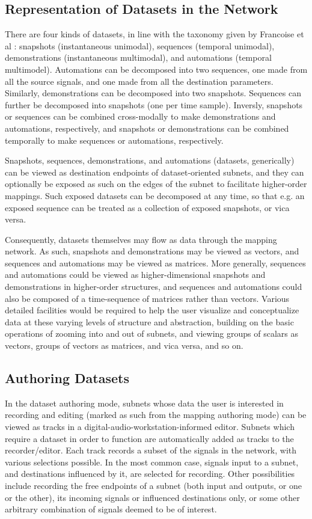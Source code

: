 \documentclass[main.tex]{subfiles}
\begin{document}
\subsection{Representation of Datasets in the Network}

There are four kinds of datasets, in line with the taxonomy given by Francoise 
et al \cite{francoise2014nime_xmm}: snapshots (instantaneous unimodal), 
sequences (temporal unimodal), demonstrations (instantaneous multimodal), and 
automations (temporal multimodel). Automations can be decomposed into two 
sequences, one made from all the source signals, and one made from all the 
destination parameters. Similarly, demonstrations can be decomposed into two 
snapshots. Sequences can further be decomposed into snapshots (one per time 
sample). Inversly, snapshots or sequences can be combined cross-modally to make 
demonstrations and automations, respectively, and snapshots or demonstrations 
can be combined temporally to make sequences or automations, respectively.

Snapshots, sequences, demonstrations, and automations (datasets, generically) 
can be viewed as destination endpoints of dataset-oriented subnets, and they 
can optionally be exposed as such on the edges of the subnet to facilitate 
higher-order mappings. Such exposed datasets can be decomposed at any time, so 
that e.g. an exposed sequence can be treated as a collection of exposed 
snapshots, or vica versa.

Consequently, datasets themselves may flow as data through the mapping network. 
As such, snapshots and demonstrations may be viewed as vectors, and sequences 
and automations may be viewed as matrices. More generally, sequences and 
automations could be viewed as higher-dimensional snapshots and demonstrations 
in higher-order structures, and sequences and automations could also be 
composed of a time-sequence of matrices rather than vectors. Various detailed 
facilities would be required to help the user visualize and conceptualize data 
at these varying levels of structure and abstraction, building on the basic 
operations of zooming into and out of subnets, and viewing groups of scalars as 
vectors, groups of vectors as matrices, and vica versa, and so on.

\subsection{Authoring Datasets}

In the dataset authoring mode, subnets whose data the user is interested in
recording and editing (marked as such from the mapping authoring mode) can be
viewed as tracks in a digital-audio-workstation-informed editor. Subnets which
require a dataset in order to function are automatically added as tracks to the
recorder/editor. Each track records a subset of the signals in the network,
with various selections possible. In the most common case, signals input to a
subnet, and destinations influenced by it, are selected for recording. Other
possibilities include recording the free endpoints of a subnet (both input and
outputs, or one or the other), its incoming signals or influenced destinations
only, or some other arbitrary combination of signals deemed to be of interest.
\end{document}
